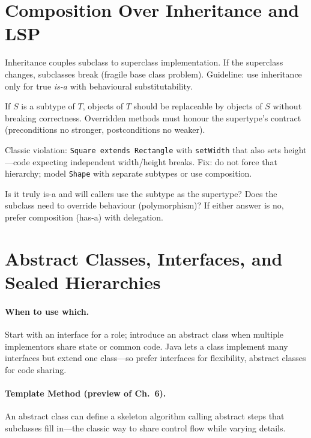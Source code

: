 \section{Composition Over Inheritance and LSP}
\label{sec:composition-lsp}
Inheritance couples subclass to superclass implementation. If the superclass changes, subclasses break (fragile base class problem). Guideline: use inheritance only for true \emph{is-a} with behavioural substitutability.

\begin{definition}
If $S$ is a subtype of $T$, objects of $T$ should be replaceable by objects of $S$ without breaking correctness. Overridden methods must honour the supertype's contract (preconditions no stronger, postconditions no weaker).
\end{definition}

Classic violation: \texttt{Square extends Rectangle} with \texttt{setWidth} that also sets height---code expecting independent width/height breaks. Fix: do not force that hierarchy; model \texttt{Shape} with separate subtypes or use composition.

\begin{remark}
Is it truly is-a and will callers use the subtype as the supertype? Does the subclass need to override behaviour (polymorphism)? If either answer is no, prefer composition (has-a) with delegation.
\end{remark}

\section{Abstract Classes, Interfaces, and Sealed Hierarchies}
\label{sec:abstract-interfaces}
\paragraph{When to use which.} Start with an interface for a role; introduce an abstract class when multiple implementors share state or common code. Java lets a class implement many interfaces but extend one class---so prefer interfaces for flexibility, abstract classes for code sharing.

\paragraph{Template Method (preview of Ch.~6).} An abstract class can define a skeleton algorithm calling abstract steps that subclasses fill in---the classic way to share control flow while varying details.

